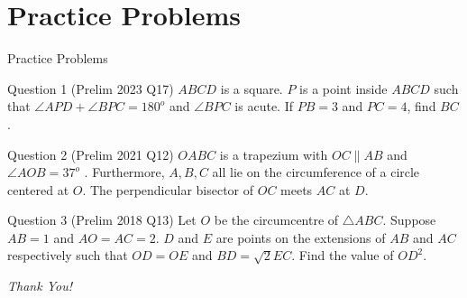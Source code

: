\documentclass{beamer}
\begin{document}
\section{Practice Problems}
\begin{frame}{Practice Problems}
	\begin{block}{Question 1}
		(Prelim 2023 Q17) $ABCD$ is a square. $P$ is a point inside $ABCD$ such that $\angle APD + \angle BPC = 180^o$ and  $\angle BPC$ is acute.  If $PB = 3$ and $PC = 4$, find $BC$.
	\end{block}
	\begin{block}{Question 2}
		(Prelim 2021 Q12) $OABC$ is a trapezium with $OC \parallel AB$ and $\angle AOB = 37^o$	. Furthermore, $A,B,C$ all lie on the circumference of a circle centered at $O$. The perpendicular bisector of $OC$ meets $AC$ at $D$.
	\end{block}
	\begin{block}{Question 3}
		(Prelim 2018 Q13) Let $O$ be the circumcentre of $\triangle ABC$. Suppose $AB = 1$ and $AO = AC = 2$. $D$ and $E$ are points on the extensions of $AB$ and $A C$ respectively such that $OD = OE $ and $BD = \sqrt{2} EC$. Find the value of $OD^2$.
	\end{block}
\end{frame}
\begin{frame}{}
  \centering \Large
  \emph{Thank You!}
\end{frame}
\end{document}
